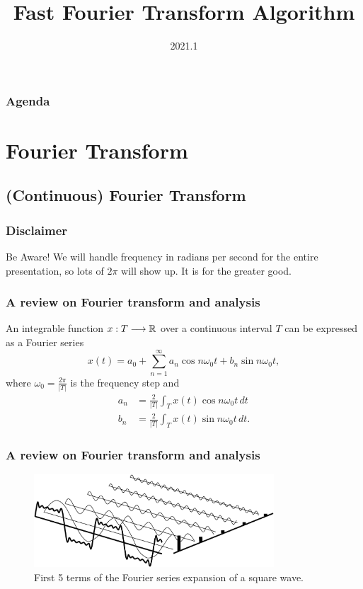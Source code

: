 \documentclass{beamer}
\title[FFT]{Fast Fourier Transform Algorithm}
\date{2021.1}
\begin{document}
\frame{\titlepage}

\begin{frame}
    \frametitle{Agenda}
    \tableofcontents
\end{frame}

\section{Fourier Transform}

\subsection{(Continuous) Fourier Transform}

\begin{frame}
    \frametitle{Disclaimer}
    \begin{alertblock}{Be Aware!}
	We will handle frequency in radians per second for the entire presentation, so lots of $2\pi$ will show up. It is for the greater good.
    \end{alertblock}
\end{frame}

\begin{frame}
    \frametitle{A review on Fourier transform and analysis}
    An integrable function $x: T \longrightarrow \mathbb{R}$ over a continuous interval $T$ can be expressed as a Fourier series \[
    x(t) = a_0 + \sum_{n=1}^{\infty} a_n \cos n\omega_0 t + b_n \sin n\omega_0 t
    ,\] where $\omega_0 = \frac{2\pi}{|T|}$ is the frequency step and
    \begin{align*}
        a_n &= \frac{2}{|T|} \int_T x(t) \cos n\omega_0 t \,dt \\
        b_n &= \frac{2}{|T|} \int_T x(t) \sin n\omega_0 t \,dt
    .\end{align*}
\end{frame}

\begin{frame}
    \frametitle{A review on Fourier transform and analysis}
    \begin{figure}
        \centering
        \includegraphics[width=0.8\textwidth]{fourier_series.png}
        \caption{First 5 terms of the Fourier series expansion of a square wave.}
        \label{fig:fourier_series-png}
    \end{figure}
\end{frame}
\end{document}

